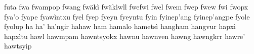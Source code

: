 \documentclass[a4paper]{article}
\begin{document}
futa\hspace{2mm}
fwa\hspace{2mm}
fwampop\hspace{2mm}
fwang\hspace{2mm}
fwäkì\hspace{2mm}
fwäkìwll\hspace{2mm}
fwefwi\hspace{2mm}
fwel\hspace{2mm}
fwem\hspace{2mm}
fwep\hspace{2mm}
fwew\hspace{2mm}
fwi\hspace{2mm}
fwopx\hspace{2mm}
fya'o\hspace{2mm}
fyape\hspace{2mm}
fyawìntxu\hspace{2mm}
fyel\hspace{2mm}
fyep\hspace{2mm}
fyeyn\hspace{2mm}
fyeyntu\hspace{2mm}
fyin\hspace{2mm}
fyinep'ang\hspace{2mm}
fyinep'angpe\hspace{2mm}
fyole\hspace{2mm}
fyolup\hspace{2mm}
ha\hspace{2mm}
ha'\hspace{2mm}
ha'ngir\hspace{2mm}
hahaw\hspace{2mm}
ham\hspace{2mm}
hamalo\hspace{2mm}
hametsì\hspace{2mm}
hangham\hspace{2mm}
hangvur\hspace{2mm}
hapxì\hspace{2mm}
hapxìtu\hspace{2mm}
hawl\hspace{2mm}
hawmpam\hspace{2mm}
hawntsyokx\hspace{2mm}
hawnu\hspace{2mm}
hawnven\hspace{2mm}
hawng\hspace{2mm}
hawngkrr\hspace{2mm}
hawre'\hspace{2mm}
hawtsyìp\hspace{2mm}
\end{document}
